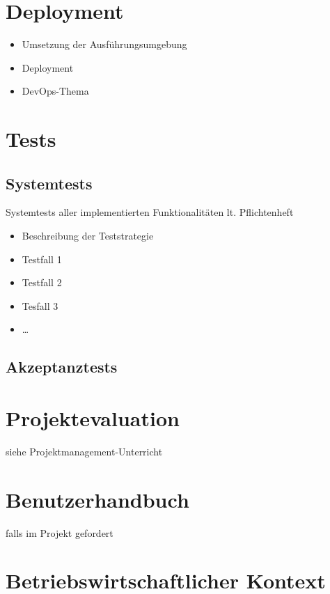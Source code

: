 \chapter{Deployment}
\begin{itemize}
	\item Umsetzung der Ausführungsumgebung
	\item Deployment
	\item DevOps-Thema
\end{itemize}

\chapter{Tests}

\section{Systemtests} 
Systemtests aller implementierten Funktionalitäten lt. Pflichtenheft
\begin{itemize}
	\item Beschreibung der Teststrategie
	\item Testfall 1
	\item Testfall 2
	\item Tesfall 3
	\item …
\end{itemize}

\section{Akzeptanztests}

\chapter{Projektevaluation}
siehe Projektmanagement-Unterricht

\chapter{Benutzerhandbuch} 
falls im Projekt gefordert

\newpage
\chapter{Betriebswirtschaftlicher Kontext}


\def \currentAuthor {Kevin Glatz}

                                                                        
